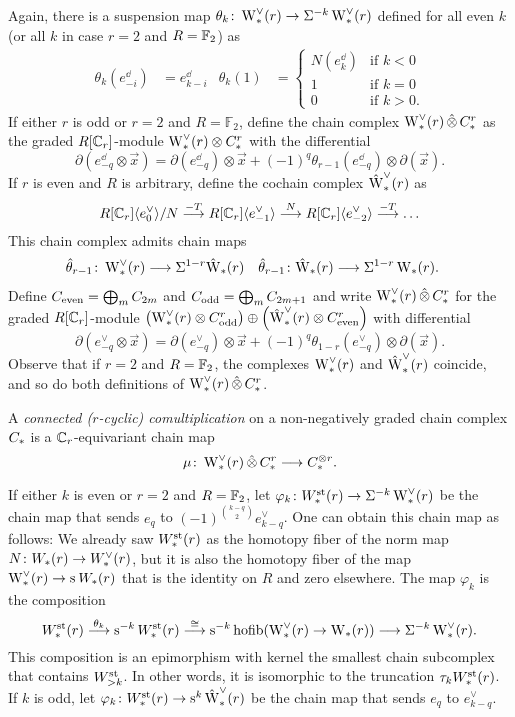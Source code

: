 Again, there is a suspension map $\theta_k\colon \rWd(r)\to \susp{-k}\rWd(r)$ defined for all even $k$ (or all $k$ in case $r=2$ and $R=\bF_2$) as
\begin{align*}
	\theta_k(e_{-i}^\dd) &= e_{k-i}^\dd 
	&
	\theta_k(1) &= \begin{cases} N(e_k^\dd) &\text{if $k<0$} \\ 1 &\text{if $k=0$} \\ 0 &\text{if $k>0$.} \end{cases}
\end{align*}
If either $r$ is odd or $r=2$ and $R=\mathbb{F}_2$, define the chain complex $\rWd(r)\hotimes \rucadenas$ as the graded $R[\Cyc_r]$-module $\rWd(r)\otimes \rucadenas$ with the differential
\[
\partial(e^\dd_{-q}\otimes \vec{x}) = \partial (e^\dd_{-q})\otimes \vec{x} + (-1)^q \theta_{r-1}(e^\dd_{-q})\otimes \partial (\vec{x}).
\]
If $r$ is even and $R$ is arbitrary, define the cochain complex $\rWhatd(r)$ as
\[
R[\Cyc_r]\langle e_{0}^\dd\rangle / N \overset{-T}{\lra} R[\Cyc_r]\langle e_{-1}^\dd\rangle \overset{N}{\lra} R[\Cyc_r]\langle e_{-2}^\dd\rangle \overset{-T}{\lra}\ldots
\]
This chain complex admits chain maps 
\begin{align*}
    \hat{\theta}_{r-1}\colon \rWd(r)&\lra \susp{1-r}\rWhat(r)
    &
    \hat{\theta}_{r-1}\colon \rWhat(r)&\lra \susp{1-r}\rW(r).
\end{align*} 
Define $\ucadenas[\mathrm{even}] = \bigoplus_{m}\ucadenas[2m]$ and $\ucadenas[\mathrm{odd}] = \bigoplus_{m}\ucadenas[2m+1]$ and write $\rWd(r)\hotimes \rucadenas$ for the graded $R[\Cyc_r]$-module $\left(\rWd(r)\otimes \rucadenas[\mathrm{odd}]\right)\oplus \left(\rWhatd(r)\otimes \rucadenas[\mathrm{even}]\right)$ with differential
\[
\partial(e^\vee_{-q}\otimes \vec{x}) = \partial (e^\vee_{-q})\otimes \vec{x} + (-1)^q \theta_{1-r}(e^\vee_{-q})\otimes \partial (\vec{x}).
\]
Observe that if $r=2$ and $R=\bF_2$, the complexes $\rWd(r)$ and $\rWhatd(r)$ coincide, and so do both definitions of $\rWd(r)\hotimes \rucadenas$.
\begin{definition}
	A \emph{connected ($r$-cyclic) comultiplication} on a non-negatively graded chain complex $\ucadenas$ is a $\Cyc_r$-equivariant chain map
	\[
	\mu\colon \rWd(r)\hotimes \rucadenas\lra \ucadenas^{\otimes r}.
	\]
\end{definition}

If either $k$ is even or $r=2$ and $R=\bF_2$, let $\varphi_k\colon \Wst(r)\to \susp{-k}\rWd(r)$ be the chain map that sends $e_q$ to $(-1)^{\binom{k-q}{2}}e_{k-q}^{\vee}$. One can obtain this chain map as follows: We already saw $\Wst(r)$ as the homotopy fiber of the norm map $N\colon \W(r)\to \Wd(r)$, but it is also the homotopy fiber of the map $\rWd(r)\to \sus{}\W(r)$ that is the identity on $R$ and zero elsewhere. The map $\varphi_k$ is the composition
\[
	\Wst(r)\overset{\theta_k}{\lra} \sus{-k} \Wst(r) \overset{\cong}{\lra} \sus{-k}\hofib(\rWd(r)\to \rW(r)) \lra \susp{-k}\rWd(r).
\]
This composition is an epimorphism with kernel the smallest chain subcomplex that contains $\Wst[>k]$. In other words, it is isomorphic to the truncation $\tau_k \Wst(r)$. If $k$ is odd, let $\varphi_k\colon \Wst(r)\to \sus{k}\rWhatd(r)$ be the chain map that sends $e_q$ to $e_{k-q}^{\vee}$. 

